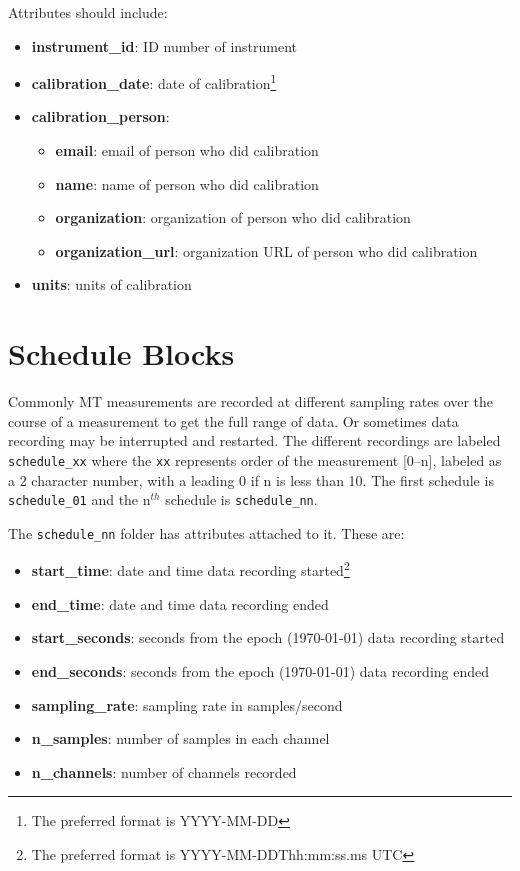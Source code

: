 \documentclass{article}
\newcommand{\attr}[1]{\textbf{#1}}
\begin{document}
Attributes should include:
\begin{itemize}
	\setlength{\itemsep}{.1em}
	\item \attr{instrument\_id}: ID number of instrument 
	\item \attr{calibration\_date}: date of calibration\footnote[1]{The preferred format is YYYY-MM-DD}
	\item \attr{calibration\_person}:
	\begin{itemize}
		\setlength{\itemsep}{.05em}
		\item \attr{email}: email of person who did calibration
		\item \attr{name}: name of person who did calibration
		\item \attr{organization}: organization of person who did calibration
		\item \attr{organization\_url}: organization URL of person who did calibration
	\end{itemize} 
	\item \attr{units}: units of calibration
\end{itemize} 

\section{Schedule Blocks}

Commonly MT measurements are recorded at different sampling rates over the course of a measurement to get the full range of data.  Or sometimes data recording may be interrupted and restarted.  The different recordings are labeled \verb|schedule_xx| where the \verb|xx| represents order of the measurement [0--n], labeled as a 2 character number, with a leading 0 if n is less than 10.  The first schedule is \verb|schedule_01| and the n$^{th}$ schedule is \verb|schedule_nn|. 

The \verb|schedule_nn| folder has attributes attached to it.  These are:

\begin{itemize}
	\setlength{\itemsep}{.1em}
	\item \attr{start\_time}: date and time data recording started\footnote[1]{The preferred format is YYYY-MM-DDThh:mm:ss.ms UTC}
	\item \attr{end\_time}: date and time data recording ended\footnotemark[1]
	\item \attr{start\_seconds}: seconds from the epoch (1970-01-01) data recording started
	\item \attr{end\_seconds}: seconds from the epoch (1970-01-01) data recording ended
	\item \attr{sampling\_rate}: sampling rate in samples/second
	\item \attr{n\_samples}: number of samples in each channel
	\item \attr{n\_channels}: number of channels recorded
\end{itemize}  

   
\end{document}
